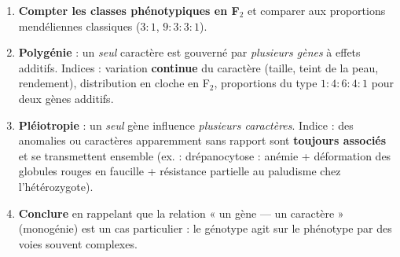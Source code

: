 \documentclass[11pt]{article}
\begin{document}
\begin{methode}
\begin{enumerate}
\item \textbf{Compter les classes phénotypiques en F$_2$} et comparer aux proportions mendéliennes classiques ($3:1$, $9:3:3:1$).
\item \textbf{Polygénie} : un \emph{seul} caractère est gouverné par \emph{plusieurs gènes} à effets additifs. Indices : variation \textbf{continue} du caractère (taille, teint de la peau, rendement), distribution en cloche en F$_2$, proportions du type $1:4:6:4:1$ pour deux gènes additifs.
\item \textbf{Pléiotropie} : un \emph{seul} gène influence \emph{plusieurs caractères}. Indice : des anomalies ou caractères apparemment sans rapport sont \textbf{toujours associés} et se transmettent ensemble (ex. : drépanocytose : anémie + déformation des globules rouges en faucille + résistance partielle au paludisme chez l'hétérozygote).
\item \textbf{Conclure} en rappelant que la relation « un gène — un caractère » (monogénie) est un cas particulier : le génotype agit sur le phénotype par des voies souvent complexes.
\end{enumerate}
\end{methode}
\end{document}
